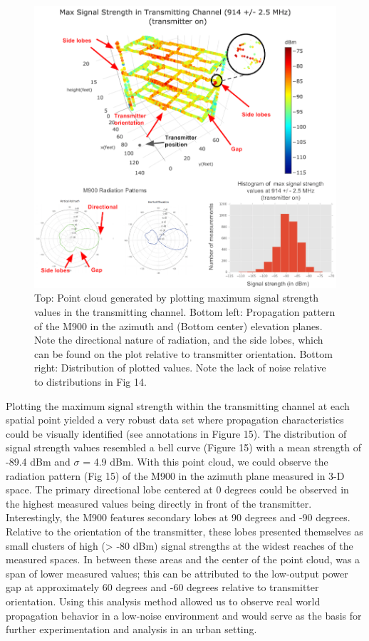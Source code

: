 \documentclass[pageno]{jpaper}
\begin{document}
\begin{figure}
	\caption[Point cloud visualization of max values from 900 MHz open field test]{Top: Point cloud generated by plotting maximum signal strength values in the transmitting channel. Bottom left: Propagation pattern of the M900 in the azimuth and (Bottom center) elevation planes. Note the directional nature of radiation, and the side lobes, which can be found on the plot relative to transmitter orientation. Bottom right: Distribution of plotted values. Note the lack of noise relative to distributions in Fig 14.  }
	\centerline{\includegraphics{Sexton_2}}
\end{figure}


Plotting the maximum signal strength within the transmitting channel at each spatial point yielded a very robust data set where propagation characteristics could be visually identified (see annotations in Figure 15). The distribution of signal strength values resembled a bell curve (Figure 15) with a mean strength of -89.4 dBm and $\sigma$ = 4.9 dBm. With this point cloud, we could observe the radiation pattern (Fig 15) of the M900 in the azimuth plane measured in 3-D space. The primary directional lobe centered at 0 degrees could be observed in the highest measured values being directly in front of the transmitter. Interestingly, the M900 features secondary lobes at 90 degrees and -90 degrees. Relative to the orientation of the transmitter, these lobes presented themselves as small clusters of high (> -80 dBm) signal strengths at the widest reaches of the measured spaces. In between these areas and the center of the point cloud, was a span of lower measured values; this can be attributed to the low-output power gap at approximately 60 degrees and -60 degrees relative to transmitter orientation. Using this analysis method allowed us to observe real world propagation behavior in a low-noise environment and would serve as the basis for further experimentation and analysis in an urban setting.
\end{document}
